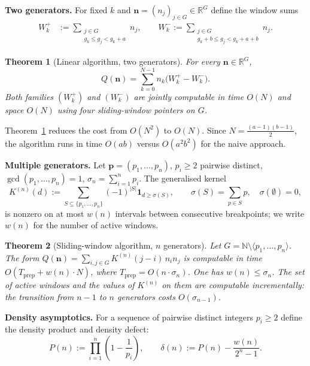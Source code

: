 \documentclass[11pt,a4paper]{amsart}
\theoremstyle{plain}
\newtheorem{theorem}{Theorem}[section]
\theoremstyle{definition}
\theoremstyle{remark}
\begin{document}
\textbf{Two generators.}
For fixed $k$ and $\mathbf{n} = (n_j)_{j \in G} \in \mathbb{R}^G$
define the window sums
\begin{align*}
  W^+_k &:= \sum_{\substack{j \in G \\ g_k \leq g_j < g_k + a}} n_j, \qquad
  W^-_k := \sum_{\substack{j \in G \\ g_k + b \leq g_j < g_k + a + b}} n_j.
\end{align*}

\begin{theorem}[Linear algorithm, two generators]
\label{thm:linear}
For every $\mathbf{n} \in \mathbb{R}^G$,
\[
  Q(\mathbf{n}) = \sum_{k=0}^{N-1} n_k \bigl(W^+_k - W^-_k\bigr).
\]
Both families $(W^+_k)$ and $(W^-_k)$ are jointly computable
in time $O(N)$ and space $O(N)$ using four sliding-window
pointers on $G$.
\end{theorem}

Theorem~\ref{thm:linear} reduces the cost from $O(N^2)$ to $O(N)$.
Since $N = \tfrac{(a-1)(b-1)}{2}$, the algorithm runs in time
$O(ab)$ versus $O(a^2 b^2)$ for the naive approach.

\textbf{Multiple generators.}
Let $\mathbf{p} = (p_1, \ldots, p_n)$, $p_i \geq 2$ pairwise distinct,
$\gcd(p_1,\ldots,p_n) = 1$, $\sigma_n = \sum_{i=1}^n p_i$.
The generalised kernel
\[
  K^{(n)}(d) := \sum_{S \subseteq \{p_1,\ldots,p_n\}} (-1)^{|S|}
               \mathbf{1}_{d \geq \sigma(S)}, \qquad
  \sigma(S) = \sum_{p \in S} p, \quad \sigma(\emptyset) = 0,
\]
is nonzero on at most $w(n)$ intervals between consecutive
breakpoints; we write $w(n)$ for the number of active windows.

\begin{theorem}[Sliding-window algorithm, $n$ generators]
\label{thm:general}
Let $G = \mathbb{N} \setminus \langle p_1,\ldots,p_n \rangle$.
The form $Q(\mathbf{n}) = \sum_{i,j \in G} K^{(n)}(j-i)\,n_i n_j$
is computable in time $O(T_{\mathrm{prep}} + w(n) \cdot N)$, where
$T_{\mathrm{prep}} = O(n \cdot \sigma_n)$.
One has $w(n) \leq \sigma_n$.
The set of active windows and the values of $K^{(n)}$ on them are
computable incrementally: the transition from $n-1$ to $n$ generators
costs $O(\sigma_{n-1})$.
\end{theorem}

\textbf{Density asymptotics.}
For a sequence of pairwise distinct integers $p_i \geq 2$
define the density product and density defect:
\[
  P(n) := \prod_{i=1}^{n} \!\left(1 - \frac{1}{p_i}\right), \qquad
  \delta(n) := P(n) - \frac{w(n)}{2^n - 1}.
\]
\end{document}
